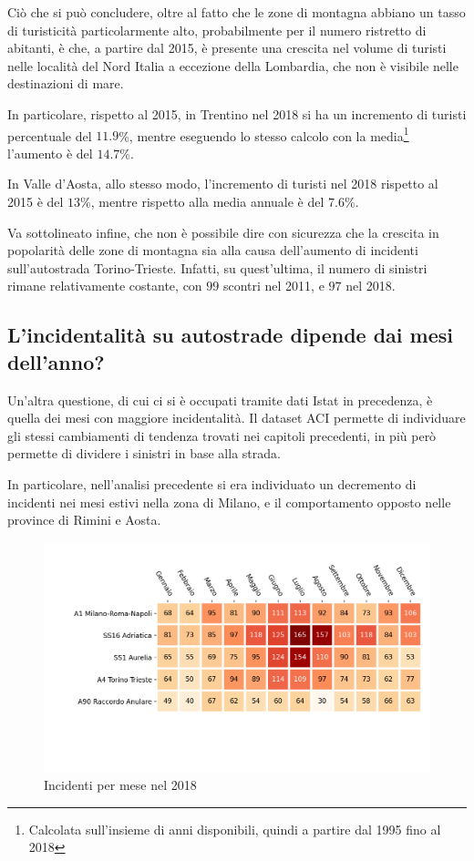 \documentclass[a4paper,12pt]{report}
\begin{document}
Ciò che si può concludere, oltre al fatto che le zone di montagna abbiano 
un tasso di turisticità particolarmente alto, probabilmente per il numero 
ristretto di abitanti, 
è che, a partire dal 2015, è presente una crescita nel volume di turisti nelle località 
del Nord Italia a eccezione della Lombardia, che non è visibile nelle 
destinazioni di mare.

In particolare, rispetto al 2015, in Trentino nel 2018 si ha un incremento 
di turisti percentuale del $11.9$\%, mentre eseguendo lo stesso calcolo con la 
media\footnote{Calcolata sull'insieme di anni disponibili, quindi 
a partire dal 1995 fino al 2018} l'aumento è del $14.7$\%.

In Valle d'Aosta, allo stesso modo, l'incremento di turisti nel 2018 
rispetto al 2015 è del $13$\%, mentre rispetto alla media annuale 
è del $7.6$\%.

Va sottolineato infine, che non è possibile dire con sicurezza che 
la crescita in popolarità delle zone di montagna sia alla causa dell'aumento 
di incidenti sull'autostrada Torino-Trieste. 
Infatti, su quest'ultima, il numero di sinistri rimane relativamente costante, 
con $99$ scontri nel 2011, e $97$ nel 2018.

\subsection{L'incidentalità su autostrade dipende dai mesi dell'anno?}

Un'altra questione, di cui ci si è occupati tramite dati Istat in precedenza, è 
quella dei mesi con maggiore incidentalità.
Il dataset ACI permette di individuare gli stessi cambiamenti di tendenza trovati nei 
capitoli precedenti, in più però permette di dividere i sinistri in base alla strada.

In particolare, nell'analisi precedente si era individuato un decremento di incidenti 
nei mesi estivi nella zona di Milano, e il comportamento opposto nelle province di 
Rimini e Aosta.

\begin{figure}
    \includegraphics[width=\linewidth]{../src/incidenti/incidenti_aci/autostrade/mesi_autostrade.png}
    \caption{Incidenti per mese nel 2018}
    \label{fig:incidenti-per-mese}
\end{figure}
\end{document}
